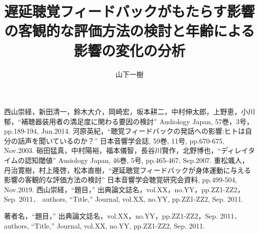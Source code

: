 \documentclass[twocolumn]{jsarticle}
\title{遅延聴覚フィードバックがもたらす影響の客観的な評価方法の検討と年齢による影響の変化の分析}
\author{山下\hspace{1zw}一樹}
\begin{document}
\maketitle







\newpage\newpage
\begin{thebibliography}{99}
	西山崇経，新田清一，鈴木大介，岡崎宏，坂本耕二，中村伸太郎，上野恵，小川郁，``補聴器装用者の満足度に関わる要因の検討'' Audiology Japan, 57巻，3号，pp.189-194, Jun.2014.
	河原英紀，``聴覚フィードバックの発話への影響:ヒトは自分の話声を聞いているのか？'' 日本音響学会誌, 59巻, 11号, pp.670-675, Nov.2003.
	硲田猛真，中村陽裕，福本儀智，長谷川賢作，北野博也，``ディレイタイムの認知閾値'' Ausiology Japan, 46巻, 5号, pp.465-467, Sep.2007.
	重松颯人，丹治寛樹，村上隆啓，松本直樹，``遅延聴覚フィードバックが身体運動に与える影響の客観的な評価方法の検討'' 日本音響学会聴覚研究会資料, pp.499-504, Nov.2019.
	西山崇経，``題目，\<'' 出典論文誌名，vol.XX，no.YY，pp.ZZ1-ZZ2，Sep. 2011．
	authors, ``Title,'' Journal, vol.XX, no.YY, pp.ZZ1-ZZ2, Sep. 2011.
\end{thebibliography}

\begin{thepublished}{99}
	著者名，``題目，\<'' 出典論文誌名，vol.XX，no.YY，pp.ZZ1-ZZ2，Sep. 2011．
	authors, ``Title,'' Journal, vol.XX, no.YY, pp.ZZ1-ZZ2, Sep. 2011.
\end{thepublished}
\end{document}
